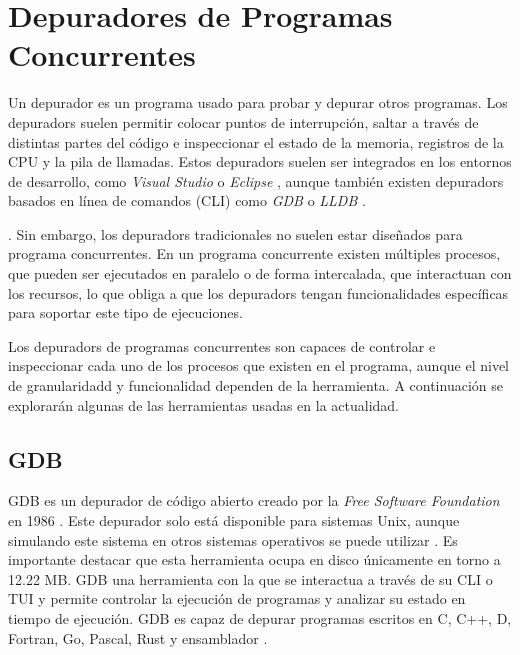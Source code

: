 \section{Depuradores de Programas Concurrentes}\label{sec:depuradores-programas-concurrentes}

Un \gls{depurador} \cite{WikipediaDebugger} es un programa usado para probar y \gls{depurar} otros programas. Los \glspl{depurador} suelen permitir colocar puntos de interrupción, saltar a través de distintas partes del código e inspeccionar el estado de la memoria, registros de la \gls{CPU} y la pila de llamadas.
Estos \glspl{depurador} suelen ser integrados en los entornos de desarrollo, como \textit{Visual Studio} \cite{DebuggerVisualStudio} o \textit{Eclipse} \cite{DebuggerEclipse}, aunque también existen \glspl{depurador} basados en línea de comandos (\gls{CLI}) como \textit{\gls{GDB}} \cite{GDB} o \textit{\gls{LLDB}} \cite{LLDB}. 

.
Sin embargo, los \glspl{depurador} tradicionales no suelen estar diseñados para \glspl {programa concurrente}. En un \gls{programa concurrente} \cite{ParallelismComputerArchitecture} existen múltiples \glspl{proceso}, que pueden ser ejecutados en paralelo o de forma intercalada, que interactuan con los recursos, lo que obliga a que los \glspl{depurador} tengan funcionalidades específicas para soportar este tipo de ejecuciones.

Los \glspl{depurador} de programas concurrentes son capaces de controlar e inspeccionar cada uno de los procesos que existen en el programa, aunque el nivel de granularidadd y funcionalidad dependen de la herramienta. A continuación se explorarán algunas de las herramientas usadas en la actualidad.

\subsection{GDB}{\label{subsec:gdb}}
\gls{GDB} es un \gls{depurador} de código abierto creado por la \textit{Free Software Foundation} en 1986 \cite{GDB}. Este \gls{depurador} solo está disponible para sistemas \gls{Unix}, aunque simulando este sistema en otros sistemas operativos se puede utilizar \cite{GDBDownload}. Es importante destacar que esta herramienta ocupa en disco únicamente en torno a 12.22 MB. 
\gls{GDB} una herramienta con la que se interactua a través de su \gls{CLI} o \gls{TUI} y permite controlar la ejecución de programas y analizar su estado en tiempo de ejecución. \gls{GDB} es capaz de depurar programas escritos en \gls{C}, \gls{C++}, \gls{D}, \gls{Fortran}, \gls{Go}, \gls{Pascal}, \gls{Rust} y \gls{ensamblador} \cite{GDB}.  

